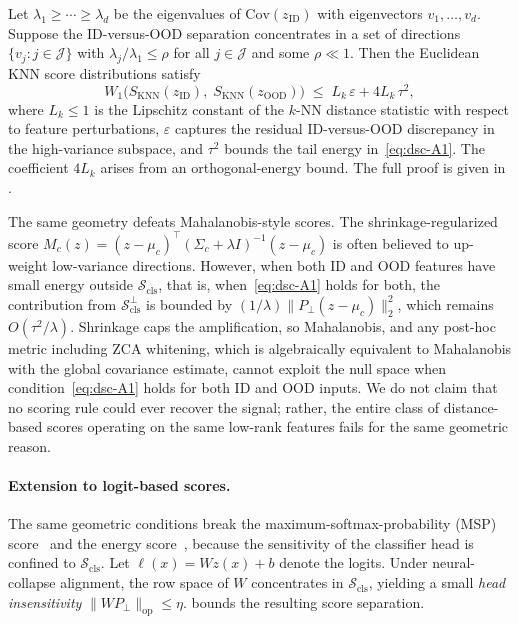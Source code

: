 \begin{theorem}\label{thm:dsc:dist-fail}
Let $\lambda_1 \ge \cdots \ge \lambda_d$ be the eigenvalues of $\mathrm{Cov}(z_{\mathrm{ID}})$ with eigenvectors $v_1,\ldots,v_d$. Suppose the ID-versus-OOD separation concentrates in a set of directions $\{v_j : j \in \mathcal{J}\}$ with $\lambda_j / \lambda_1 \le \rho$ for all $j \in \mathcal{J}$ and some $\rho \ll 1$. Then the Euclidean KNN score distributions satisfy
\begin{equation}
  W_1\!\bigl(S_{\mathrm{KNN}}(z_{\mathrm{ID}}),\; S_{\mathrm{KNN}}(z_{\mathrm{OOD}})\bigr) \;\le\; L_k\,\varepsilon + 4L_k\,\tau^2,
  \label{eq:dsc-knn-fail}
\end{equation}
where $L_k \le 1$ is the Lipschitz constant of the $k$-NN distance statistic with respect to feature perturbations, $\varepsilon$ captures the residual ID-versus-OOD discrepancy in the high-variance subspace, and $\tau^2$ bounds the tail energy in~\eqref{eq:dsc-A1}. The coefficient $4L_k$ arises from an orthogonal-energy bound. The full proof is given in .
\end{theorem}

The same geometry defeats Mahalanobis-style scores. The shrinkage-regularized score $M_c(z) = (z - \mu_c)^\top(\Sigma_c + \lambda I)^{-1}(z - \mu_c)$ is often believed to up-weight low-variance directions. However, when both ID and OOD features have small energy outside $\mathcal{S}_{\mathrm{cls}}$, that is, when~\eqref{eq:dsc-A1} holds for both, the contribution from $\mathcal{S}_{\mathrm{cls}}^\perp$ is bounded by $(1/\lambda)\|P_\perp(z - \mu_c)\|_2^2$, which remains $O(\tau^2/\lambda)$. Shrinkage caps the amplification, so Mahalanobis, and any post-hoc metric including ZCA whitening, which is algebraically equivalent to Mahalanobis with the global covariance estimate, cannot exploit the null space when condition~\eqref{eq:dsc-A1} holds for both ID and OOD inputs. We do not claim that no scoring rule could ever recover the signal; rather, the entire class of distance-based scores operating on the same low-rank features fails for the same geometric reason.

\paragraph{Extension to logit-based scores.}
The same geometric conditions break the maximum-softmax-probability (MSP) score~\citep{hendrycks2016baseline} and the energy score~\citep{liu2020energy}, because the sensitivity of the classifier head is confined to $\mathcal{S}_{\mathrm{cls}}$. Let $\ell(x) = Wz(x) + b$ denote the logits. Under neural-collapse alignment, the row space of $W$ concentrates in $\mathcal{S}_{\mathrm{cls}}$, yielding a small \emph{head insensitivity} $\|WP_\perp\|_{\mathrm{op}} \le \eta$.  bounds the resulting score separation.

